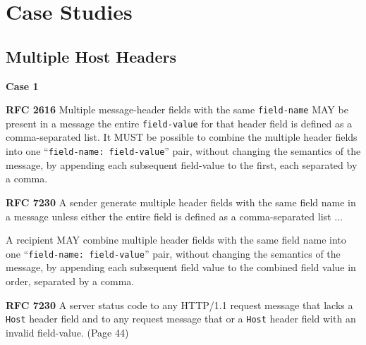 \section{Case Studies}
\subsection{Multiple Host Headers}
\textbf{Case 1}
\vspace{1ex}
\begin{spacing}{0.8}
	\begin{tcolorbox}
	
		\textbf{RFC 2616}
		Multiple message-header fields with the same \texttt{field-name} MAY be present in a message {\color{red}{ if and only if (隐晦地说明Multiple Host是不允许的)}} the entire \texttt{field-value} for that header field is defined as a comma-separated list. It MUST be possible to combine the multiple header fields into one ``\texttt{field-name: field-value}'' pair, without changing the semantics of the message, by appending each subsequent field-value to the first, each separated by a comma. 
	\end{tcolorbox}
\end{spacing} 

\vspace{1ex}

\begin{spacing}{0.8}
		\begin{tcolorbox}
		\textbf{RFC 7230} 
		A sender {\color{red}{MUST NOT}} generate multiple header fields with the same field name in a message unless either the entire field is defined  as a comma-separated list ...
	
		A recipient MAY combine multiple header fields with the same field name into one ``\texttt{field-name: field-value}'' pair, without changing the semantics of the message, by appending each subsequent field value to the combined field value in order, separated by a comma. 
	\end{tcolorbox}
\end{spacing}

\vspace{1ex}

\begin{spacing}{0.8}
	\begin{tcolorbox}
		\textbf{RFC 7230}
		A server {\color{red}{MUST respond with a 400 (Bad Request)}} status code to any HTTP/1.1 request message that lacks a \texttt{Host} header field and to any request message that {} or a \texttt{Host} header field with an invalid field-value. (Page 44)
	\end{tcolorbox}
\end{spacing}

